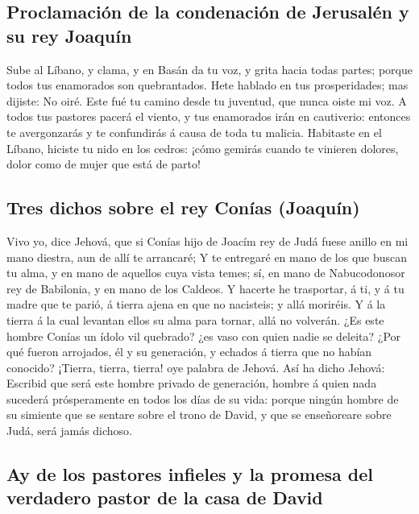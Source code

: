\hypertarget{proclamaciuxf3n-de-la-condenaciuxf3n-de-jerusaluxe9n-y-su-rey-joaquuxedn}{%
\subsection{Proclamación de la condenación de Jerusalén y su rey
Joaquín}\label{proclamaciuxf3n-de-la-condenaciuxf3n-de-jerusaluxe9n-y-su-rey-joaquuxedn}}

 Sube al Líbano, y clama, y en Basán da tu voz, y grita
hacia todas partes; porque todos tus enamorados son quebrantados.
 Hete hablado en tus prosperidades; mas dijiste: No oiré.
Este fué tu camino desde tu juventud, que nunca oiste mi voz.
 A todos tus pastores pacerá el viento, y tus enamorados
irán en cautiverio: entonces te avergonzarás y te confundirás á causa de
toda tu malicia.  Habitaste en el Líbano, hiciste tu nido
en los cedros: ¡cómo gemirás cuando te vinieren dolores, dolor como de
mujer que está de parto!

\hypertarget{tres-dichos-sobre-el-rey-conuxedas-joaquuxedn}{%
\subsection{Tres dichos sobre el rey Conías
(Joaquín)}\label{tres-dichos-sobre-el-rey-conuxedas-joaquuxedn}}

 Vivo yo, dice Jehová, que si Conías hijo de Joacím rey
de Judá fuese anillo en mi mano diestra, aun de allí te arrancaré;
 Y te entregaré en mano de los que buscan tu alma, y en
mano de aquellos cuya vista temes; sí, en mano de Nabucodonosor rey de
Babilonia, y en mano de los Caldeos.  Y hacerte he
trasportar, á ti, y á tu madre que te parió, á tierra ajena en que no
nacisteis; y allá moriréis.  Y á la tierra á la cual
levantan ellos su alma para tornar, allá no volverán. 
¿Es este hombre Conías un ídolo vil quebrado? ¿es vaso con quien nadie
se deleita? ¿Por qué fueron arrojados, él y su generación, y echados á
tierra que no habían conocido?  ¡Tierra, tierra, tierra!
oye palabra de Jehová.  Así ha dicho Jehová: Escribid que
será este hombre privado de generación, hombre á quien nada sucederá
prósperamente en todos los días de su vida: porque ningún hombre de su
simiente que se sentare sobre el trono de David, y que se enseñoreare
sobre Judá, será jamás dichoso.

\hypertarget{ay-de-los-pastores-infieles-y-la-promesa-del-verdadero-pastor-de-la-casa-de-david}{%
\subsection{Ay de los pastores infieles y la promesa del verdadero
pastor de la casa de
David}\label{ay-de-los-pastores-infieles-y-la-promesa-del-verdadero-pastor-de-la-casa-de-david}}

